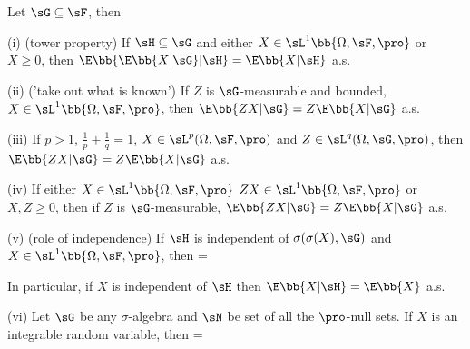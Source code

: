 \begin{proposition}\label{pro:conditional_expectation_tower_independence}
Let $\sG \subseteq \sF$, then
\ben
\item [(i)] (tower property) If $\sH\subseteq \sG$ and either $X\in \sL^1\bb{\Omega,\sF,\pro}$ or $X\geq 0$, then $\E\bb{\E\bb{X|\sG}|\sH} = \E\bb{X|\sH}$ a.s.
\item [(ii)] ('take out what is known') If $Z$ is $\sG$-measurable and bounded, $X\in \sL^1\bb{\Omega,\sF,\pro}$, then $\E\bb{ZX|\sG} = Z\E\bb{X|\sG}$ a.s.
\item [(iii)] If $p>1$, $\frac 1p + \frac 1q =1$, $X\in \sL^p(\Omega,\sF,\pro)$ and $Z\in \sL^q(\Omega,\sG,\pro)$, then $\E\bb{ZX|\sG} = Z\E\bb{X|\sG}$ a.s.
\item [(iv)] If either $X\in \sL^1\bb{\Omega,\sF,\pro}$ $ZX\in \sL^1\bb{\Omega,\sF,\pro}$ or $X,Z\geq 0$, then if $Z$ is $\sG$-measurable, $\E\bb{ZX|\sG} = Z\E\bb{X|\sG}$ a.s.
\item [(v)] (role of independence) If $\sH$ is independent of $\sigma(\sigma(X),\sG)$ and $X\in \sL^1\bb{\Omega,\sF,\pro}$, then
\be
\E{} = \E{} \ 
\ee

In particular, if $X$ is independent of $\sH$ then $\E\bb{X | \sH} = \E\bb{X}$ a.s.
\item [(vi)] Let $\sG$ be any $\sigma$-algebra and $\sN$ be set of all the $\pro$-null sets. If $X$ is an integrable random variable, then
\be
\E{} = \E{}\ 
\ee
\een
\end{proposition}

